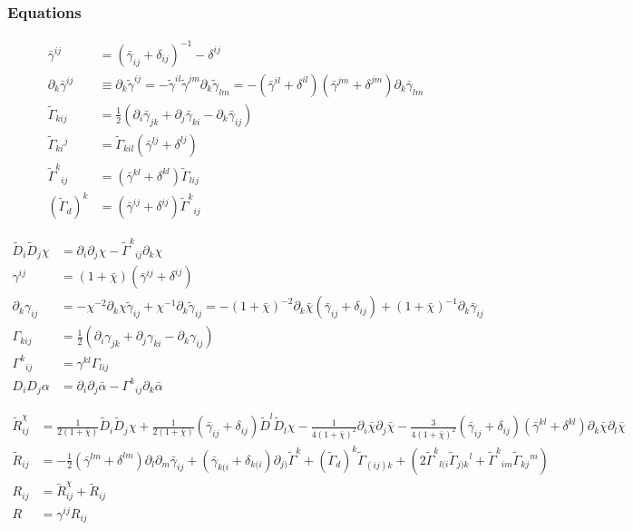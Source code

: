 \documentclass[prd,aps,a4paper,superscriptaddress,onecolumn,footinbib]{revtex4}
\begin{document}
\subsubsection{Equations}
\begin{align}
  \bar{\gamma}^{ij}
  &=(\bar{\gamma}_{ij}+\delta_{ij})^{-1}-\delta^{ij}
  \\
  \partial_k\bar{\gamma}^{ij}
  &\equiv\partial_k\tilde{\gamma}^{ij}
  =-\tilde\gamma^{il}\tilde\gamma^{jm}\partial_k\tilde\gamma_{lm}
  =-(\bar\gamma^{il}+\delta^{il})(\bar\gamma^{jm}+\delta^{jm})\partial_k\bar\gamma_{lm}
  \\
  \tilde{\Gamma}_{kij}
  &=\frac{1}{2}
  \left(
    \partial_i\bar{\gamma}_{jk}+
    \partial_j\bar{\gamma}_{ki}-
    \partial_k\bar{\gamma}_{ij}
  \right)
  \\
  \tilde{\Gamma}_{ki}{}^j
  &=\tilde{\Gamma}_{kil}(\bar\gamma^{lj}+\delta^{lj})
  \\
  \tilde{\Gamma}^k{}_{ij}
  &=(\bar\gamma^{kl}+\delta^{kl})\tilde\Gamma_{lij}
  \\
  (\tilde\Gamma_d)^k
  &=(\bar\gamma^{ij}+\delta^{ij})\tilde\Gamma^k{}_{ij}
\end{align}

\begin{align}
  \tilde{D}_i\tilde{D}_j\chi
  &=\partial_i\partial_j\chi
  -\tilde\Gamma^k{}_{ij}\partial_k\chi
  \\
  \gamma^{ij}
  &=(1+\bar\chi)(\bar\gamma^{ij}+\delta^{ij})
  \\
  \partial_k\gamma_{ij}
  &=-\chi^{-2}\partial_k\chi\tilde\gamma_{ij}+\chi^{-1}\partial_k\tilde\gamma_{ij}
  =-(1+\bar\chi)^{-2}\partial_k\bar\chi(\bar\gamma_{ij}+\delta_{ij})
  +(1+\bar\chi)^{-1}\partial_k\bar\gamma_{ij}
  \\
  \Gamma_{kij}
  &=\frac{1}{2}
  \left(
    \partial_i\gamma_{jk}+
    \partial_j\gamma_{ki}-
    \partial_k\gamma_{ij}
  \right)
  \\
  \Gamma^k{}_{ij}
  &=\gamma^{kl}\Gamma_{lij}
  \\
  D_iD_j\alpha
  &=\partial_i\partial_j\bar\alpha-\Gamma^k{}_{ij}\partial_k\bar\alpha
\end{align}

\begin{align}
  \tilde{R}^\chi_{ij}
  &=\frac{1}{2(1+\bar\chi)}\tilde{D}_i\tilde{D}_j\chi
  +\frac{1}{2(1+\bar\chi)}(\bar\gamma_{ij}+\delta_{ij})\tilde{D}^l\tilde{D}_l\chi
  -\frac{1}{4(1+\bar\chi)^2}\partial_i\bar\chi\partial_j\bar\chi
  -\frac{3}{4(1+\bar\chi)^2}
  (\bar\gamma_{ij}+\delta_{ij})(\bar\gamma^{kl}+\delta^{kl})
  \partial_k\bar\chi\partial_l\bar\chi
  \\
  \tilde{R}_{ij}
  &=-\frac{1}{2}(\bar\gamma^{lm}+\delta^{lm})\partial_l\partial_m\bar\gamma_{ij}
  +(\bar\gamma_{k(i}+\delta_{k(i})\partial_{j)}\tilde\Gamma^k
  +(\tilde\Gamma_d)^k\tilde\Gamma_{(ij)k}
  +(2\tilde\Gamma^k{}_{l(i}\tilde\Gamma_{j)k}{}^l+\tilde\Gamma^k{}_{im}\tilde\Gamma_{kj}{}^m)
  \\
  R_{ij}
  &=\tilde{R}^\chi_{ij}+\tilde{R}_{ij}
  \\
  R
  &=\gamma^{ij}R_{ij}
\end{align}
\end{document}
